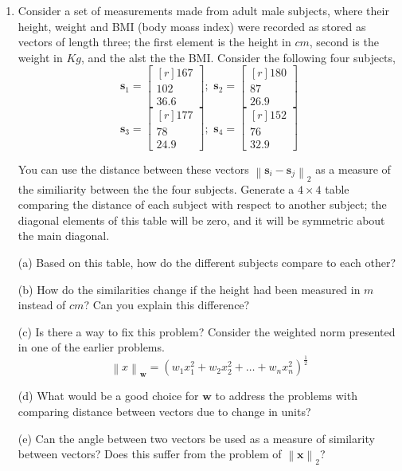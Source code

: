 \documentclass[9pt]{article}
\begin{document}
\begin{multicols}{2}
\begin{enumerate}
      \item Consider a set of measurements made from adult male subjects, where their height, weight and BMI (body moass index) were recorded as stored as vectors of length three; the first element is the height in $cm$, second is the weight in $Kg$, and the alst the the BMI. Consider the following four subjects,
      \[ \mathbf{s}_1 =  \begin{bmatrix*}[r]167\\102\\36.6\end{bmatrix*}; \,\,
      \mathbf{s}_2 =  \begin{bmatrix*}[r]180\\87\\26.9\end{bmatrix*} \]
      \[ \mathbf{s}_3 =  \begin{bmatrix*}[r]177\\78\\24.9\end{bmatrix*}; \,\,
      \mathbf{s}_4 =  \begin{bmatrix*}[r]152\\76\\32.9\end{bmatrix*} \]
  
      You can use the distance between these vectors $\left\lVert \mathbf{s}_i - \mathbf{s}_j\right\rVert_2$ as a measure of the similiarity between the the four subjects. Generate a $4 \times 4$ table comparing the distance of each subject with respect to another subject; the diagonal elements of this table will be zero, and it will be symmetric about the main diagonal. 
  
      (a) Based on this table, how do the different subjects compare to each other?
  
      (b) How do the similarities change if the height had been measured in $m$ instead of $cm$? Can you explain this difference?
  
      (c) Is there a way to fix this problem? Consider the weighted norm presented in one of the earlier problems.
      \[ \left\lVert x \right\rVert_\mathbf{w} = \left(w_1x_1^2 + w_2x_2^2 + \ldots + w_nx_n^2\right)^{\frac{1}{2}} \]
  
      (d) What would be a good choice for $\mathbf{w}$ to address the problems with comparing distance between vectors due to change in units?
  
      (e) Can the angle between two vectors be used as a measure of similarity between vectors? Does this suffer from the problem of $\left\lVert \mathbf{x} \right\rVert_2$?
  \end{enumerate}

\end{multicols}
\end{document}
